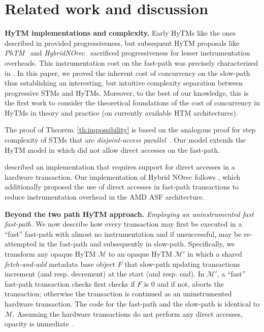 \section{Related work and discussion}
\label{sec:rel}
%
\vspace{1mm}\noindent\textbf{HyTM implementations and complexity.}
Early HyTMs like the ones described in \cite{damronhytm, kumarhytm} provided progressiveness, but
subsequent HyTM proposals like \emph{PhTM}~\cite{phasedtm} and \emph{HybridNOrec}~\cite{hybridnorec} sacrificed progressiveness for lesser instrumentation overheads.
This instrumentation cost on the fast-path was precisely characterized in \cite{htmdisc15}.
In this paper, we proved the inherent cost of concurrency on the slow-path thus establishing an interesting, but intuitive complexity separation between progressive STMs and HyTMs.
Moreover, to the best of our knowledge, this is the first work to consider the theoretical foundations of the cost of concurrency in HyTMs in theory and practice (on currently available HTM architectures).

The proof of Theorem~\ref{th:impossibility} is based on the analogous proof for step complexity of STMs that are \emph{disjoint-access parallel}~\cite{prog15-pact, tm-book}.
Our model extends the HyTM model in \cite{hytm14disc} which did not allow direct accesses on the fast-path.

\cite{kumarhytm} described an implementation that requires support for direct accesses in a hardware transaction. 
Our implementation of Hybrid NOrec follows \cite{hynorecriegel}, which additionally proposed the use of direct accesses
in fast-path transactions to reduce instrumentation overhead in the AMD ASF architecture.

\vspace{1mm}\noindent\textbf{Beyond the two path HyTM approach.}
\vspace{1mm}\noindent\textit{Employing an uninstrumented fast fast-path.}
We now describe how every transaction may first be executed in a ``fast'' fast-path with almost no instrumentation
and if unsuccessful, may be re-attempted in the fast-path and subsequently in slow-path.
Specifically, we transform any opaque HyTM $\mathcal{M}$ to an opaque
HyTM $\mathcal{M}'$ in which a shared \emph{fetch-and-add} metadata base object $F$ that slow-path updating transactions
increment (and resp. decrement) at the start (and resp. end). In $\mathcal{M}'$, a ``fast'' fast-path transaction checks first checks if $F$ is $0$
and if not, aborts the transaction; otherwise the transaction is continued as an uninstrumented hardware transaction.
The code for the fast-path and the slow-path is identical to $\mathcal{M}$.
Assuming the hardware transactions do not perform any direct accesses, opacity is immediate~\cite{brownfaster15}.

